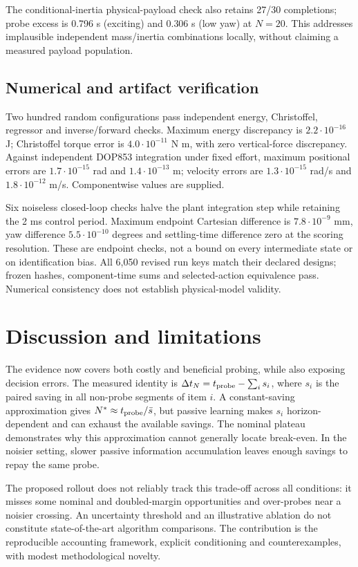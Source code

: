 \documentclass[10pt,twocolumn]{article}
\begin{document}
The conditional-inertia physical-payload check also retains 27/30 completions; probe excess is 0.796 s (exciting) and 0.306 s (low yaw) at $N=20$. This addresses implausible independent mass/inertia combinations locally, without claiming a measured payload population.

\subsection{Numerical and artifact verification}
Two hundred random configurations pass independent energy, Christoffel, regressor and inverse/forward checks. Maximum energy discrepancy is $2.2\cdot10^{-16}$ J; Christoffel torque error is $4.0\cdot10^{-11}$ N m, with zero vertical-force discrepancy. Against independent DOP853 integration under fixed effort, maximum positional errors are $1.7\cdot10^{-15}$ rad and $1.4\cdot10^{-13}$ m; velocity errors are $1.3\cdot10^{-15}$ rad/s and $1.8\cdot10^{-12}$ m/s. Componentwise values are supplied.

Six noiseless closed-loop checks halve the plant integration step while retaining the 2 ms control period. Maximum endpoint Cartesian difference is $7.8\cdot10^{-9}$ mm, yaw difference $5.5\cdot10^{-10}$ degrees and settling-time difference zero at the scoring resolution. These are endpoint checks, not a bound on every intermediate state or on identification bias. All 6,050 revised run keys match their declared designs; frozen hashes, component-time sums and selected-action equivalence pass. Numerical consistency does not establish physical-model validity.

\section{Discussion and limitations}
The evidence now covers both costly and beneficial probing, while also exposing decision errors. The measured identity is $\Delta t_N=t_{\rm probe}-\sum_i s_i$, where $s_i$ is the paired saving in all non-probe segments of item $i$. A constant-saving approximation gives $N^*\approx t_{\rm probe}/\bar s$, but passive learning makes $s_i$ horizon-dependent and can exhaust the available savings. The nominal plateau demonstrates why this approximation cannot generally locate break-even. In the noisier setting, slower passive information accumulation leaves enough savings to repay the same probe.

The proposed rollout does not reliably track this trade-off across all conditions: it misses some nominal and doubled-margin opportunities and over-probes near a noisier crossing. An uncertainty threshold and an illustrative ablation do not constitute state-of-the-art algorithm comparisons. The contribution is the reproducible accounting framework, explicit conditioning and counterexamples, with modest methodological novelty.
\end{document}
